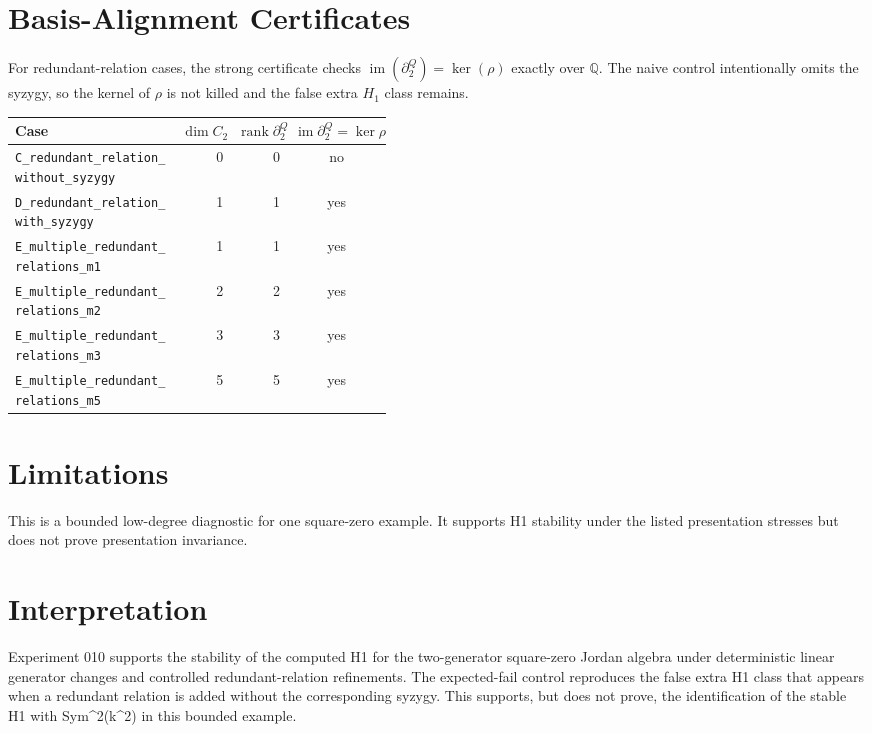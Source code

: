 \documentclass[11pt]{article}
\begin{document}
\section{Basis-Alignment Certificates}
For redundant-relation cases, the strong certificate checks \(\operatorname{im}(\partial_2^Q)=\ker(\rho)\) exactly over \(\mathbb{Q}\).  The naive control intentionally omits the syzygy, so the kernel of \(\rho\) is not killed and the false extra $H_1$ class remains.

\begin{center}
\small
\begin{tabular}{p{0.44\linewidth}rrc}
\toprule
Case & \(\dim C_2\) & \(\operatorname{rank}\partial_2^Q\) & \(\operatorname{im}\partial_2^Q=\ker\rho\) \\
\midrule
\texttt{C\_redundant\_relation\_without\_syzygy} & 0 & 0 & no \\
\texttt{D\_redundant\_relation\_with\_syzygy} & 1 & 1 & yes \\
\texttt{E\_multiple\_redundant\_relations\_m1} & 1 & 1 & yes \\
\texttt{E\_multiple\_redundant\_relations\_m2} & 2 & 2 & yes \\
\texttt{E\_multiple\_redundant\_relations\_m3} & 3 & 3 & yes \\
\texttt{E\_multiple\_redundant\_relations\_m5} & 5 & 5 & yes \\
\bottomrule
\end{tabular}
\end{center}

\section{Limitations}
This is a bounded low-degree diagnostic for one square-zero example. It supports H1 stability under the listed presentation stresses but does not prove presentation invariance.

\section{Interpretation}
Experiment 010 supports the stability of the computed H1 for the two-generator square-zero Jordan algebra under deterministic linear generator changes and controlled redundant-relation refinements. The expected-fail control reproduces the false extra H1 class that appears when a redundant relation is added without the corresponding syzygy. This supports, but does not prove, the identification of the stable H1 with Sym\^{}2(k\^{}2) in this bounded example.
\end{document}
